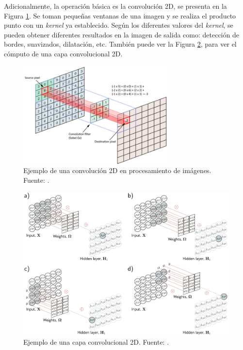 Adicionalmente, la operación básica es la convolución 2D, se presenta en la Figura \ref{fig:cnn}. Se toman pequeñas ventanas de una imagen y se realiza el producto punto con un \textit{kernel} ya establecido. Según los diferentes valores del \textit{kernel}, se pueden obtener diferentes resultados en la imagen de salida como: detección de bordes, suavizados, dilatación, etc. También puede ver la Figura \ref{fig:conv2d}, para ver el cómputo de una capa convolucional 2D.


\begin{figure}[H]
	\centering
	\includegraphics[width=0.7\textwidth]{../img/neoantigen/cnn}
	\caption{Ejemplo de una convolución 2D en procesamiento de imágenes. Fuente: \cite{Shuchen2022}.}
	\label{fig:cnn}
\end{figure}

\begin{figure}[h]
	\centering
	\includegraphics[width=\textwidth]{../img/theory/conv2d}
	\caption{Ejemplo de una capa convolucional 2D. Fuente: \cite{prince2023understanding}.}
	\label{fig:conv2d}
\end{figure}

